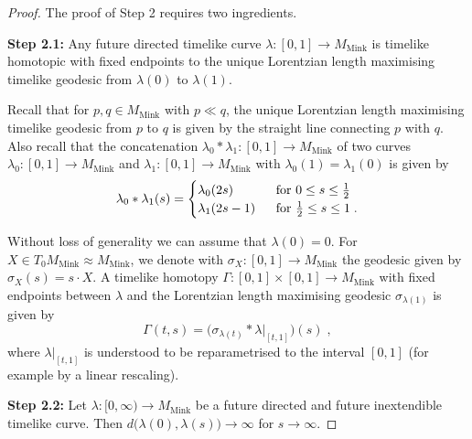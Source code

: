 \documentclass[reqno]{article}
\newcommand{\Mmink}{M_{\mathrm{Mink}}}
\begin{document}
\begin{proof}
The proof of Step 2 requires two ingredients.
\vspace*{2mm}

\textbf{Step 2.1:} Any future directed timelike curve $\lambda : [0,1] \to \Mmink$  is timelike homotopic with fixed endpoints to the unique Lorentzian length maximising timelike geodesic from $\lambda(0)$ to $\lambda(1)$.  
\vspace*{2mm}

Recall that for $p, q \in \Mmink$ with $p \ll q $, the unique Lorentzian length maximising timelike geodesic from $p$ to $q$ is given by the straight line connecting $p$ with $q$. Also recall that the concatenation $\lambda_0 * \lambda_1 : [0,1] \to \Mmink$ of two curves $\lambda_0 : [0,1] \to \Mmink$ and $\lambda_1 : [0,1] \to \Mmink$ with $\lambda_0(1) = \lambda_1(0)$ is given by
\begin{equation*}
\lambda_0 * \lambda_1 (s) = \begin{cases} \lambda_0(2s) &\textnormal{ for } 0 \leq s \leq \frac{1}{2} \\ \lambda_1(2s -1) \; &\textnormal{ for } \frac{1}{2} \leq s \leq 1 \;.\end{cases} 
\end{equation*}

Without loss of generality we can assume that $\lambda(0) =0$. For $X \in T_0\Mmink \approx \Mmink$, we denote with $\sigma_X : [0,1] \to \Mmink$ the geodesic given by $\sigma_X (s) = s \cdot X$. A timelike homotopy $\Gamma : [0,1] \times [0,1] \to \Mmink$ with fixed endpoints between $\lambda$ and the Lorentzian length maximising geodesic $\sigma_{\lambda(1)}$ is given by
\begin{equation*}
\Gamma(t,s) = \big( \sigma_{\lambda(t)} * \lambda|_{[t,1]}\big) (s) \;,
\end{equation*}
where $\lambda|_{[t,1]}$ is understood to be reparametrised to the interval $[0,1]$ (for example by a linear rescaling).
\begin{center}
\def\svgwidth{7.5cm}

\end{center}
\vspace*{2mm}

\textbf{Step 2.2:} Let $\lambda : [0, \infty) \to \Mmink$ be a future directed and future inextendible timelike curve. Then $d\big(\lambda(0), \lambda(s)\big) \to \infty$ for $s \to \infty$.
\vspace*{2mm}


\end{proof}
\end{document}
